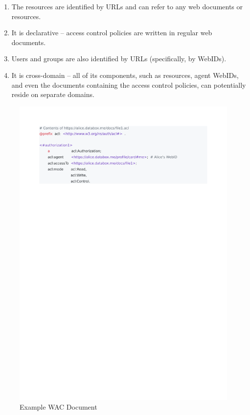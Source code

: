 \documentclass[sigconf]{acmart}
\begin{document}
\begin{enumerate}
\item The resources are identified by URLs and can refer to any web documents or resources.
\item It is declarative -- access control policies are written in regular web documents.
\item Users and groups are also identified by URLs (specifically, by WebIDs).
\item It is cross-domain -- all of its components, such as resources, agent WebIDs, and even the documents containing the access control policies, can potentially reside on separate domains.
\end{enumerate}

\begin{figure}
  \includegraphics[trim=2cm 21.9cm 4.7cm 2cm, clip, scale=0.57]{pdf/alice-permission}
  \caption{Example WAC Document}
  \label{fig:individual-permission}
\end{figure}
\end{document}
